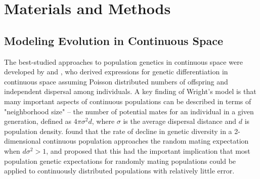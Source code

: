 \documentclass[11pt,twoside,lineno]{preprint}
\newif\ifcomments
\newcommand{\cjb}[1]{\ifcomments{{\color{orange} \it (#1)}}\else{}\fi}
\newcommand{\ak}[1]{\ifcomments{{\color{red} \it (#1)}}\else{}\fi}
\begin{document}
\ak{I think we can cut the following paragraph if we just add the last sentence above} 
\cjb{agree - commenting out}

\section{Materials and Methods}
\label{sec:materials:methods}

\subsection{Modeling Evolution in Continuous Space}
The best-studied approaches to population genetics in continuous space were developed by \cite{Wright1942,Wright1943} and \cite{Malecot1948}, who derived expressions for genetic differentiation in continuous space assuming Poisson distributed numbers of offspring and independent dispersal among individuals. A key finding of Wright's model is that many important aspects of continuous populations can be described in terms of "neighborhood size" -- the number of potential mates for an individual in a given generation, defined as $4\pi\sigma^2d$, where $\sigma$ is the average dispersal distance and $d$ is population density. \cite{Maruyama1972} found that the rate of decline in genetic diversity in a 2-dimensional continuous population approaches the random mating expectation when $d\sigma^2 > 1$, and proposed that this had the important implication that most population genetic expectations for randomly mating populations could be applied to continuously distributed populations with relatively little error. 
\end{document}
